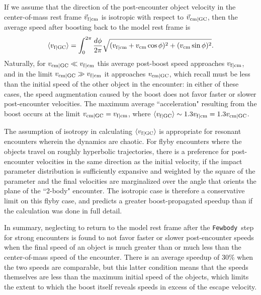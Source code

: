 \documentclass[twocolumn]{aastex631}
\newcommand{\fewbody}{\texttt{Fewbody}}
\begin{document}
If we assume that the direction of the post-encounter object velocity in the center-of-mass rest frame $\vec{v}_{\rm f|cm}$ is isotropic with respect to $\vec{v}_{\rm cm|GC}$, then the average speed after boosting back to the model rest frame is
\begin{equation}
    \langle v_{\rm f|GC} \rangle
    = \int_0^{2\pi} \frac{d\phi}{2\pi} \sqrt{(v_{\rm f|cm} + v_{\rm cm} \cos \phi)^2 + (v_{\rm cm} \sin \phi)^2}.
\end{equation}
Naturally, for $v_{\rm cm|GC} \ll v_{\rm f|cm}$ this average post-boost speed approaches $v_{\rm f|cm}$, and in the limit $v_{\rm cm|GC} \gg v_{\rm f|cm}$ it approaches $v_{\rm cm|GC}$, which recall must be less than the initial speed of the other object in the encounter: in either of these cases, the speed augmentation caused by the boost does not favor faster or slower post-encounter velocities.
The maximum average ``acceleration" resulting from the boost occurs at the limit $v_{\rm cm|GC} = v_{\rm f|cm}$, where $\langle v_{\rm f|GC} \rangle \sim 1.3 v_{\rm f|cm} = 1.3 v_{\rm cm|GC}$.

The assumption of isotropy in calculating $\langle v_{\rm f|GC} \rangle$ is appropriate for resonant encounters wherein the dynamics are chaotic.
For flyby encounters where the objects travel on roughly hyperbolic trajectories, there is a preference for post-encounter velocities in the same direction as the initial velocity, if the impact parameter distribution is sufficiently expansive and weighted by the square of the parameter and the final velocities are marginalized over the angle that orients the plane of the ``2-body" encounter.
The isotropic case is therefore a conservative limit on this flyby case, and predicts a greater boost-propagated speedup than if the calculation was done in full detail.

In summary, neglecting to return to the model rest frame after the \fewbody\ step for strong encounters is found to not favor faster or slower post-encounter speeds when the final speed of an object is much greater than or much less than the center-of-mass speed of the encounter.
There is an average speedup of 30\% when the two speeds are comparable, but this latter condition means that the speeds themselves are less than the maximum initial speed of the objects, which limits the extent to which the boost itself reveals speeds in excess of the escape velocity.


\end{document}
